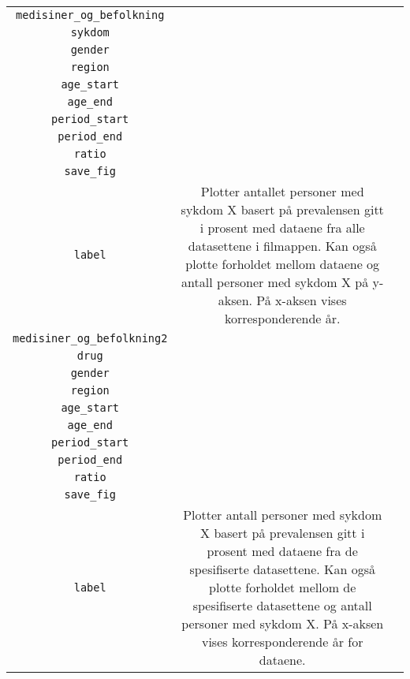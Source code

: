 \documentclass[12pt,norsk,a4paper,fleqn]{article}
\numberwithin{equation}{section}
\begin{document}
{\begin{longtable}[l]{c|c|m{75mm}}
{\color{blue}\texttt{medisiner\_og\_befolkning}} & 
\color{red}\makecell{{\texttt{prevalens}\\\texttt{sykdom}\\\texttt{gender}\\ \texttt{region}\\ \texttt{age\_start}\\ \texttt{age\_end}\\ \texttt{period\_start}\\ \texttt{period\_end}\\ \texttt{ratio}\\ \texttt{save\_fig}\\ \texttt{label}}} & Plotter antallet personer med sykdom X basert på prevalensen gitt i prosent med dataene fra alle datasettene i filmappen. Kan også plotte forholdet mellom dataene og antall personer med sykdom X på y-aksen. På x-aksen vises korresponderende år.\\ \hline

{\color{blue}\texttt{medisiner\_og\_befolkning2}} & 
\color{red}\makecell{{\texttt{prevalens}\\\texttt{drug}\\\texttt{gender}\\ \texttt{region}\\ \texttt{age\_start}\\ \texttt{age\_end}\\ \texttt{period\_start}\\ \texttt{period\_end}\\ \texttt{ratio}\\ \texttt{save\_fig}\\ \texttt{label}}} & Plotter antall personer med sykdom X basert på prevalensen gitt i prosent med dataene fra de spesifiserte datasettene. Kan også plotte forholdet mellom de spesifiserte datasettene og antall personer med sykdom X. På x-aksen vises korresponderende år for dataene.\\ \hline

\end{longtable}
}
\end{document}
